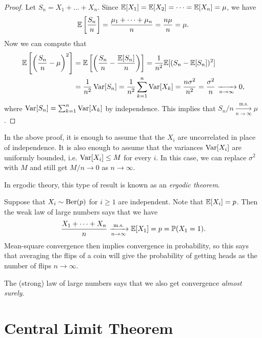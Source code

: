 \begin{proof}
  Let $S_n = X_1 + \dots + X_n$.
  Since $\mathbb{E}[X_1] = \mathbb{E}[X_2] = \dots = \mathbb{E}[X_n] = \mu$,
  we have
  \[
    \mathbb{E}\left[\frac{S_n}{n}\right]
    = \frac{\mu_1 + \dots + \mu_n}{n} = \frac{n\mu}{n}
    = \mu.
  \]
  Now we can compute that
  \begin{align*}
    \mathbb{E}\left[\left(\frac{S_n}{n} - \mu\right)^2\right]
    &= \mathbb{E}\left[\left(\frac{S_n}{n} - \frac{\mathbb{E}[S_n]}{n}\right)\right]
    = \frac{1}{n^2} \mathbb{E}[(S_n - \mathbb{E}[S_n])^2] \\
    &= \frac{1}{n^2} \operatorname{Var}[S_n]
    = \frac{1}{n^2} \sum_{k = 1}^n \operatorname{Var}[X_k]
    = \frac{n\sigma^2}{n^2} = \frac{\sigma^2}{n}
    \xrightarrow[n \to \infty]{} 0,
  \end{align*}
  where $\operatorname{Var}[S_n] = \sum_{k = 1}^n \operatorname{Var}[X_k]$ by independence.
  This implies that $S_n / n \xrightarrow[n \to \infty]{\mathrm{m.s.}} \mu$.
\end{proof}

\begin{remark}
  In the above proof, it is enough to assume that the
  $X_i$ are uncorrelated in place of independence.
  It is also enough to assume that the variances
  $\operatorname{Var}[X_i]$ are uniformly bounded, i.e.
  $\operatorname{Var}[X_i] \le M$ for every $i$. In this case,
  we can replace $\sigma^2$ with $M$ and still get
  $M / n \to 0$ as $n \to \infty$.
\end{remark}

\begin{remark}
  In ergodic theory, this type of result is known
  as an \emph{ergodic theorem}.
\end{remark}

\begin{example}
  Suppose that $X_i \sim \operatorname{Ber}(p)$ for $i \ge 1$
  are independent. Note that $\mathbb{E}[X_i] = p$.
  Then the weak law of large numbers says that
  we have
  \[
    \frac{X_1 + \dots + X_n}{n} \xrightarrow[n \to \infty]{\mathrm{m.s.}} \mathbb{E}[X_1] = p = \mathbb{P}(X_1 = 1).
  \]
  Mean-square convergence then implies
  convergence in probability, so
  this says that averaging the flips of a coin
  will give the probability of getting heads
  as the number of flips $n \to \infty$.
\end{example}

\begin{remark}
  The (strong) law of large numbers says that
  we also get convergence \emph{almost surely}.
\end{remark}

\section{Central Limit Theorem}

